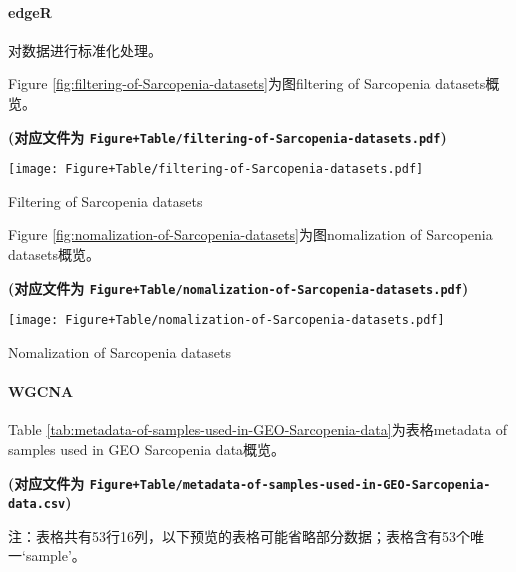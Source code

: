 \documentclass[
]{article}
\begin{document}
\hypertarget{edger}{%
\paragraph{edgeR}\label{edger}}

对数据进行标准化处理。

Figure \ref{fig:filtering-of-Sarcopenia-datasets}为图filtering of Sarcopenia datasets概览。

\textbf{(对应文件为 \texttt{Figure+Table/filtering-of-Sarcopenia-datasets.pdf})}

\def\@captype{figure}
\begin{center}
\texttt{[image: Figure+Table/filtering-of-Sarcopenia-datasets.pdf]}
\caption{Filtering of Sarcopenia datasets}\label{fig:filtering-of-Sarcopenia-datasets}
\end{center}

Figure \ref{fig:nomalization-of-Sarcopenia-datasets}为图nomalization of Sarcopenia datasets概览。

\textbf{(对应文件为 \texttt{Figure+Table/nomalization-of-Sarcopenia-datasets.pdf})}

\def\@captype{figure}
\begin{center}
\texttt{[image: Figure+Table/nomalization-of-Sarcopenia-datasets.pdf]}
\caption{Nomalization of Sarcopenia datasets}\label{fig:nomalization-of-Sarcopenia-datasets}
\end{center}

\hypertarget{wgcna}{%
\paragraph{WGCNA}\label{wgcna}}

Table \ref{tab:metadata-of-samples-used-in-GEO-Sarcopenia-data}为表格metadata of samples used in GEO Sarcopenia data概览。

\textbf{(对应文件为 \texttt{Figure+Table/metadata-of-samples-used-in-GEO-Sarcopenia-data.csv})}

\begin{center}\begin{tcolorbox}[colback=gray!10, colframe=gray!50, width=0.9\linewidth, arc=1mm, boxrule=0.5pt]注：表格共有53行16列，以下预览的表格可能省略部分数据；表格含有53个唯一`sample'。
\end{tcolorbox}
\end{center}
\end{document}
